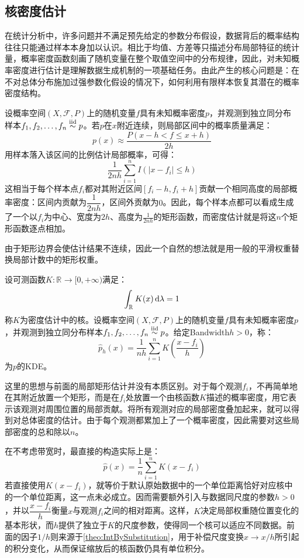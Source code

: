 \subsection{核密度估计}
在统计分析中，许多问题并不满足预先给定的参数分布假设，数据背后的概率结构往往只能通过样本本身加以认识。相比于均值、方差等只描述分布局部特征的统计量，概率密度函数刻画了随机变量在整个取值空间中的分布规律，因此，对未知概率密度进行估计是理解数据生成机制的一项基础任务。由此产生的核心问题是：在不对总体分布施加过强参数化假设的情况下，如何利用有限样本恢复其潜在的概率密度结构。\par
设概率空间$(X,\mathscr{F},P)$上的随机变量$f$具有未知概率密度$p$，并观测到独立同分布样本$f_1, f_2, \dots, f_{n}\overset{\mathrm{iid}}{\sim}p$。若$p$在$x$附近连续，则局部区间中的概率质量满足：
\begin{equation*}
	p(x)\approx\frac{P(x-h<f\leqslant x+h)}{2h}
\end{equation*}
用样本落入该区间的比例估计局部概率，可得：
\begin{equation*}
	\frac{1}{2nh}\sum_{i=1}^{n}I(|x-f_i|\leqslant h)
\end{equation*}
这相当于每个样本点$f_i$都对其附近区间$[f_i-h,f_i+h]$贡献一个相同高度的局部概率密度：区间内贡献为$\dfrac{1}{2nh}$，区间外贡献为$0$。因此，每个样本点都可以看成生成了一个以$f_i$为中心、宽度为$2h$、高度为$\frac{1}{2nh}$的矩形函数，而密度估计就是将这$n$个矩形函数逐点相加。\par
由于矩形边界会使估计结果不连续，因此一个自然的想法就是用一般的平滑权重替换局部计数中的矩形权重。
\begin{definition}
	设可测函数$K:\mathbb{R}^{}\to[0,+\infty)$满足：
	\begin{equation*}
		\int_{\mathbb{R}^{}}K(x)\mathop{}\!\mathrm{d}\lambda=1
	\end{equation*}
	称$K$为密度估计中的核。设概率空间$(X,\mathscr{F},P)$上的随机变量$f$具有未知概率密度$p$，并观测到独立同分布样本$f_1, f_2, \dots, f_{n}\overset{\mathrm{iid}}{\sim}p$。给定\gls{Bandwidth}$h>0$，称：
	\begin{equation*}
		\hat{p}_h(x)=\frac{1}{nh}\sum_{i=1}^{n}K\left(\frac{x-f_i}{h}\right)
	\end{equation*}
	为$p$的\gls{KDE}。
\end{definition}
\begin{note}
	这里的思想与前面的局部矩形估计并没有本质区别。对于每个观测$f_i$，不再简单地在其附近放置一个矩形，而是在$f_i$处放置一个由核函数$K$描述的概率密度，用它表示该观测对周围位置的局部贡献。将所有观测对应的局部密度叠加起来，就可以得到对总体密度的估计。由于每个观测都累加上了一个概率密度，因此需要对这些局部密度的总和除以$n$。\par
	在不考虑带宽时，最直接的构造实际上是：
	\begin{equation*}
		\hat{p}(x)=\frac{1}{n}\sum_{i=1}^{n}K(x-f_i)
	\end{equation*}
	若直接使用$K(x-f_i)$，就等价于默认原始数据中的一个单位距离恰好对应核中的一个单位距离，这一点未必成立。因而需要额外引入与数据同尺度的参数$h>0$，并以$\dfrac{x-f_i}{h}$衡量$x$与观测$f_i$之间的相对距离。这样，$K$决定局部权重随位置变化的基本形状，而$h$提供了独立于$K$的尺度参数，使得同一个核可以适应不同数据。前面的因子$1/h$则来源于\cref{theo:IntBySubstitution}，用于补偿尺度变换$x\to x/h$所引起的积分变化，从而保证缩放后的核函数仍具有单位积分。
\end{note}
